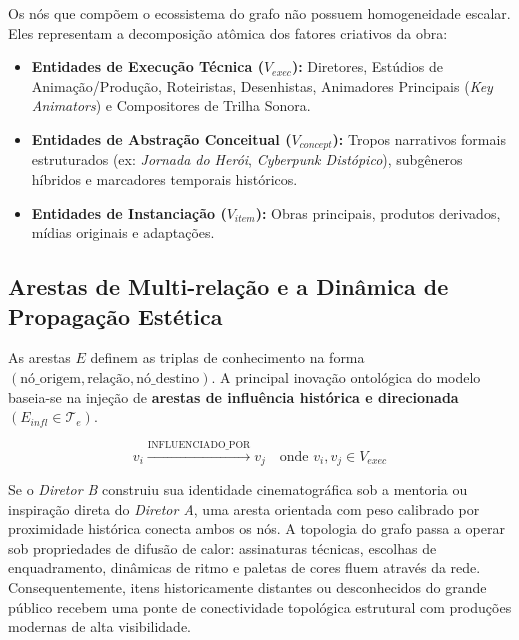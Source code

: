 \documentclass[11pt,a4paper]{article}
\begin{document}
Os nós que compõem o ecossistema do grafo não possuem homogeneidade escalar. Eles representam a
decomposição atômica dos fatores criativos da obra:
\begin{itemize}
    \item \textbf{Entidades de Execução Técnica ($V_{exec}$):} Diretores, Estúdios de
          Animação/Produção, Roteiristas, Desenhistas, Animadores Principais
          (\textit{Key Animators}) e Compositores de Trilha Sonora.
    \item \textbf{Entidades de Abstração Conceitual ($V_{concept}$):} Tropos narrativos formais
          estruturados (ex: \textit{Jornada do Herói}, \textit{Cyberpunk Distópico}), subgêneros
          híbridos e marcadores temporais históricos.
    \item \textbf{Entidades de Instanciação \texorpdfstring{($V_{item}$)}{(Vitem)}:}
          Obras principais, produtos derivados, mídias originais e adaptações.
\end{itemize}

\subsection{Arestas de Multi-relação e a Dinâmica de Propagação Estética}

As arestas $E$ definem as triplas de conhecimento na forma
$(\text{nó\_origem}, \text{relação}, \text{nó\_destino})$. A principal inovação ontológica do
modelo baseia-se na injeção de \textbf{arestas de influência histórica e direcionada}
$(E_{infl} \in \mathcal{T}_e)$.

\begin{equation}
v_i \xrightarrow{\text{INFLUENCIADO\_POR}} v_j \quad \text{onde } v_i, v_j \in V_{exec}
\end{equation}

Se o \textit{Diretor B} construiu sua identidade cinematográfica sob a mentoria ou inspiração
direta do \textit{Diretor A}, uma aresta orientada com peso calibrado por proximidade histórica
conecta ambos os nós. A topologia do grafo passa a operar sob propriedades de difusão de calor:
assinaturas técnicas, escolhas de enquadramento, dinâmicas de ritmo e paletas de cores fluem
através da rede. Consequentemente, itens historicamente distantes ou desconhecidos do grande
público recebem uma ponte de conectividade topológica estrutural com produções modernas de alta
visibilidade.

\end{document}
